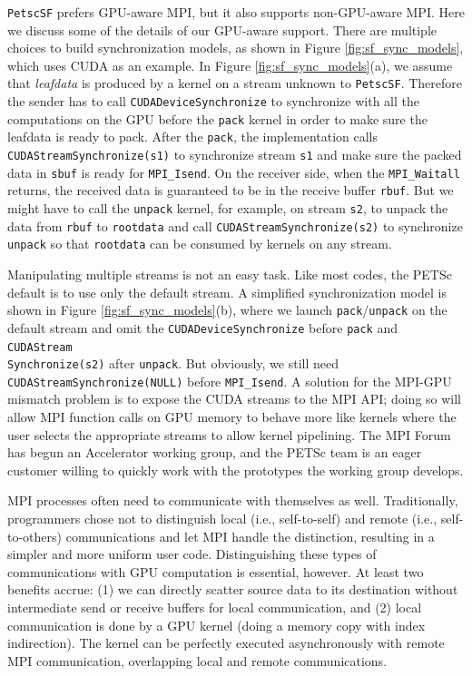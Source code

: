 \documentclass[5p,times]{elsarticle}
\begin{document}
{\tt PetscSF} prefers GPU-aware MPI, but it also supports non-GPU-aware MPI. Here we discuss some of the details of our
GPU-aware support. There are multiple choices to build synchronization models, as
shown in Figure \ref{fig:sf_sync_models}, which uses CUDA  as an example. In
Figure \ref{fig:sf_sync_models}(a), we assume that {\it leafdata} is produced by a kernel on a stream unknown to {\tt PetscSF}. Therefore the
sender has to call \texttt{CUDADeviceSynchronize} to synchronize with all the
computations on the GPU before the \texttt{pack} kernel in order to make sure the
leafdata is ready to pack. After the \texttt{pack}, the implementation calls
\texttt{CUDAStreamSynchronize(s1)} to synchronize stream \texttt{s1} and
make sure the packed data in \texttt{sbuf}
is ready for \texttt{MPI\_Isend}. 
On the receiver side, when the \texttt{MPI\_Waitall} returns, the received
data is guaranteed to be in the receive buffer \texttt{rbuf}. But we might have
to call the \texttt{unpack} kernel, for example, on stream \texttt{s2}, to unpack the data from
\texttt{rbuf} to \texttt{rootdata} and   call
\texttt{CUDAStreamSynchronize(s2)} to synchronize \texttt{unpack} so that
\texttt{rootdata} can be consumed by kernels on any stream.

Manipulating multiple streams
is not an easy task. Like most codes, the PETSc default is to use only the
default stream. A simplified synchronization model is shown in Figure
\ref{fig:sf_sync_models}(b), where we launch \texttt{pack}/\texttt{unpack} on
the default stream and omit the \texttt{CUDADeviceSynchronize} before
\texttt{pack} and \texttt{CUDAStream\\Synchronize(s2)} after \texttt{unpack}. But
obviously, we still need 
\texttt{CUDAStreamSynchronize(NULL)} 
before \texttt{MPI\_Isend}.
A solution for the MPI-GPU mismatch problem is to expose the CUDA streams to the MPI API; doing so will allow MPI function calls on GPU memory
to behave more like kernels where the user selects the appropriate streams to allow
kernel pipelining. 
The MPI Forum has begun an Accelerator working group, and the PETSc team is an eager
customer willing to quickly work with the prototypes the working group develops.  

MPI processes often need to communicate with themselves as
well. Traditionally, programmers chose not to distinguish local (i.e., self-to-self) and remote (i.e., self-to-others) communications and let MPI handle the distinction, resulting in a simpler and more uniform user code.  Distinguishing these types of communications with GPU computation is essential, however. At least two benefits accrue: (1) we can directly scatter source data to its destination
without intermediate send or receive buffers for local communication, and (2) local communication is done by a GPU kernel (doing a memory copy with index indirection). The
kernel can be perfectly executed asynchronously with remote MPI
communication, overlapping local and remote communications.
\end{document}
